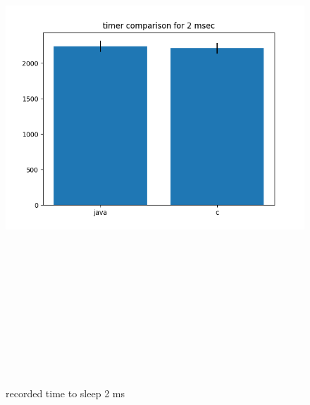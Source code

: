 \documentclass{article}
\begin{document}
    \begin{figure}[H]
    	\centering
    	\includegraphics[width=17cm,height=20cm,keepaspectratio]{AsyncMonitorCompares/sleep-timer_java-vs-c/time-compare-2.png}
    	\caption{recorded time to sleep 2 ms}
    	\label{fig:xalan-fix-PKG}
    \end{figure}
\end{document}
